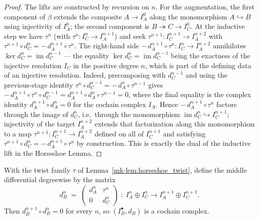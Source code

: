 \begin{proof}
  The lifts are constructed by recursion on \(n\). For the augmentation, the first
  component of \(\beta\) extends the composite \(A \to I_A^0\) along the monomorphism
  \(A \hookrightarrow B\) using injectivity of \(I_A^0\); the second component is
  \(B \twoheadrightarrow C \to I_C^0\).
  At the inductive step we have \(\tau^{n}\) (with \(\tau^{n} : I_C^{n} \to I_A^{n+1}\))
  and seek \(\tau^{n+1} : I_C^{n+1} \to I_A^{n+2}\) with
  \(\tau^{n+1} \circ d_C^n = -\,d_A^{n+1} \circ \tau^n\). The right-hand side
  \(-\,d_A^{n+1} \circ \tau^n : I_C^n \to I_A^{n+2}\) annihilates
  \(\ker d_C^n = \operatorname{im} d_C^{n-1}\) --- the equality \(\ker d_C^n =
  \operatorname{im} d_C^{n-1}\) being the exactness of the injective resolution \(I_C\) in
  the positive degree \(n\), which is part of the defining data of an injective resolution.
  Indeed, precomposing with \(d_C^{n-1}\) and using the
  previous-stage identity \(\tau^{n} \circ d_C^{n-1} = -\,d_A^{n} \circ \tau^{n-1}\) gives
  \(-\,d_A^{n+1} \circ \tau^n \circ d_C^{n-1} = d_A^{n+1} \circ d_A^{n} \circ \tau^{n-1} = 0\),
  where the final equality is the complex identity \(d_A^{n+1} \circ d_A^{n} = 0\) for the
  cochain complex \(I_A\). Hence
  \(-\,d_A^{n+1} \circ \tau^n\) factors through the image of \(d_C^n\), i.e.\ through the
  monomorphism \(\operatorname{im} d_C^n \hookrightarrow I_C^{n+1}\); injectivity of the
  target \(I_A^{n+2}\) extends that factorization along this monomorphism to a map
  \(\tau^{n+1} : I_C^{n+1} \to I_A^{n+2}\) defined on all of \(I_C^{n+1}\) and satisfying
  \(\tau^{n+1} \circ d_C^n = -\,d_A^{n+1} \circ \tau^n\) by construction. This is exactly
  the dual of the inductive lift in the Horseshoe Lemma.
\end{proof}

\begin{lemma}\label{mk-lem:horseshoe_dComp}
  \leanok

  With the twist family \(\tau\) of Lemma~\ref{mk-lem:horseshoe_twist}, define the middle
  differential degreewise by the matrix
  \[
    d_B^n \;=\;
    \begin{pmatrix} d_A^n & \tau^n \\ 0 & d_C^n \end{pmatrix}
    \;:\; I_A^n \oplus I_C^n \longrightarrow I_A^{n+1} \oplus I_C^{n+1}.
  \]
  Then \(d_B^{n+1} \circ d_B^n = 0\) for every \(n\), so \((I_B^\bullet, d_B)\) is a
  cochain complex.
\end{lemma}

